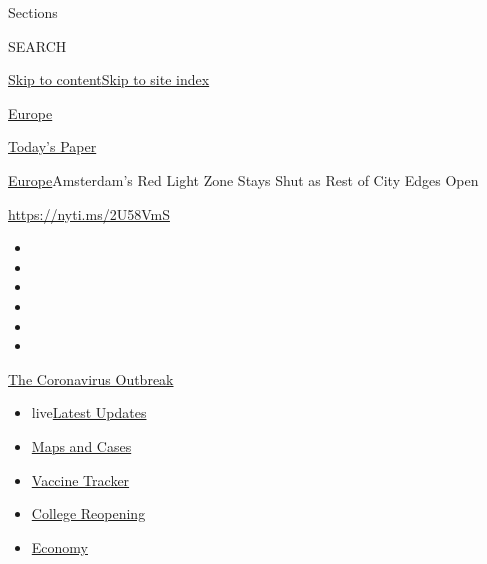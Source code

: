 Sections

SEARCH

\protect\hyperlink{site-content}{Skip to
content}\protect\hyperlink{site-index}{Skip to site index}

\href{https://www.nytimes.com/section/world/europe}{Europe}

\href{https://myaccount.nytimes.com/auth/login?response_type=cookie\&client_id=vi}{}

\href{https://www.nytimes.com/section/todayspaper}{Today's Paper}

\href{/section/world/europe}{Europe}\textbar{}Amsterdam's Red Light Zone
Stays Shut as Rest of City Edges Open

\url{https://nyti.ms/2U58VmS}

\begin{itemize}
\item
\item
\item
\item
\item
\item
\end{itemize}

\href{https://www.nytimes.com/news-event/coronavirus?action=click\&pgtype=Article\&state=default\&region=TOP_BANNER\&context=storylines_menu}{The
Coronavirus Outbreak}

\begin{itemize}
\tightlist
\item
  live\href{https://www.nytimes.com/2020/08/03/world/coronavirus-covid-19.html?action=click\&pgtype=Article\&state=default\&region=TOP_BANNER\&context=storylines_menu}{Latest
  Updates}
\item
  \href{https://www.nytimes.com/interactive/2020/us/coronavirus-us-cases.html?action=click\&pgtype=Article\&state=default\&region=TOP_BANNER\&context=storylines_menu}{Maps
  and Cases}
\item
  \href{https://www.nytimes.com/interactive/2020/science/coronavirus-vaccine-tracker.html?action=click\&pgtype=Article\&state=default\&region=TOP_BANNER\&context=storylines_menu}{Vaccine
  Tracker}
\item
  \href{https://www.nytimes.com/2020/08/02/us/covid-college-reopening.html?action=click\&pgtype=Article\&state=default\&region=TOP_BANNER\&context=storylines_menu}{College
  Reopening}
\item
  \href{https://www.nytimes.com/live/2020/08/03/business/stock-market-today-coronavirus?action=click\&pgtype=Article\&state=default\&region=TOP_BANNER\&context=storylines_menu}{Economy}
\end{itemize}


